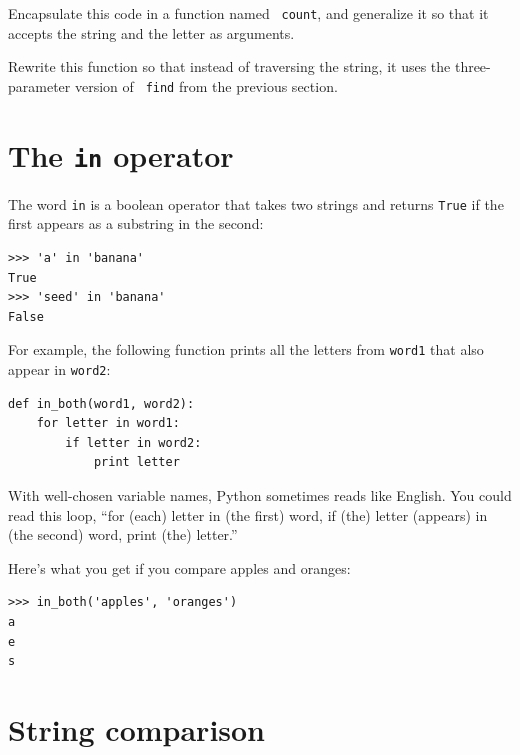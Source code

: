 \documentclass[10pt]{book}
\begin{document}
\begin{ex}

Encapsulate this code in a function named {\tt
count}, and generalize it so that it accepts the string and the
letter as arguments.
\end{ex}

\begin{ex}
Rewrite this function so that instead of
traversing the string, it uses the three-parameter version of {\tt
find} from the previous section.
\end{ex}

\section{The {\tt in} operator}
\label{inboth}


The word {\tt in} is a boolean operator that takes two strings and
returns {\tt True} if the first appears as a substring in the second:

\beforeverb
\begin{verbatim}
>>> 'a' in 'banana'
True
>>> 'seed' in 'banana'
False
\end{verbatim}
\afterverb
%
For example, the following function prints all the
letters from {\tt word1} that also appear in {\tt word2}:

\beforeverb
\begin{verbatim}
def in_both(word1, word2):
    for letter in word1:
        if letter in word2:
            print letter
\end{verbatim}
\afterverb
%
With well-chosen variable names,
Python sometimes reads like English.  You could read
this loop, ``for (each) letter in (the first) word, if (the) letter 
(appears) in (the second) word, print (the) letter.''

Here's what you get if you compare apples and oranges:

\beforeverb
\begin{verbatim}
>>> in_both('apples', 'oranges')
a
e
s
\end{verbatim}
\afterverb
%

\section{String comparison}

\end{document}
